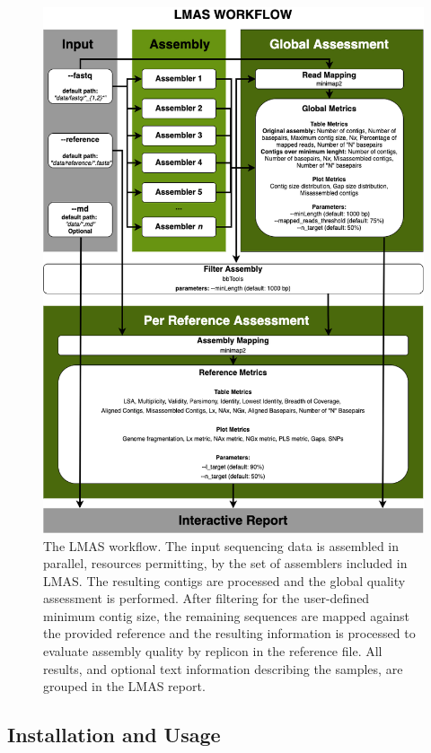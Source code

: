 \begin{figure}[]
\centering
\includegraphics[width=\textwidth]{figures/chapter 5/Figure 1.png}
\caption{The LMAS workflow. The input sequencing data is assembled in parallel, resources permitting, by the set of assemblers included in LMAS. The resulting contigs are processed and the global quality assessment is performed. After filtering for the user-defined minimum contig size, the remaining sequences are mapped against the provided reference and the resulting information is processed to evaluate assembly quality by replicon in the reference file. All results, and optional text information describing the samples, are grouped in the LMAS report.}
\label{fig:chap5_figure1}
\end{figure}

\subsection{Installation and Usage}

